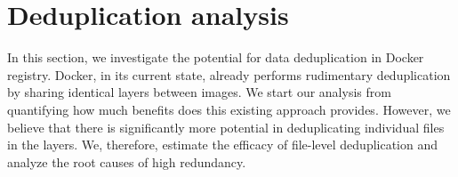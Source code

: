 \section{Deduplication analysis}
\label{sec:redundant_files}

In this section, we investigate the potential for data deduplication in Docker
registry.
%
Docker, in its current state, already performs rudimentary deduplication by
sharing identical layers between images. 
%
We start our analysis from quantifying how much benefits does this existing
approach provides.
%
However, we believe that there is significantly more potential in deduplicating
individual files in the layers.
%
We, therefore, estimate the efficacy of file-level deduplication and analyze
the root causes of high redundancy.




